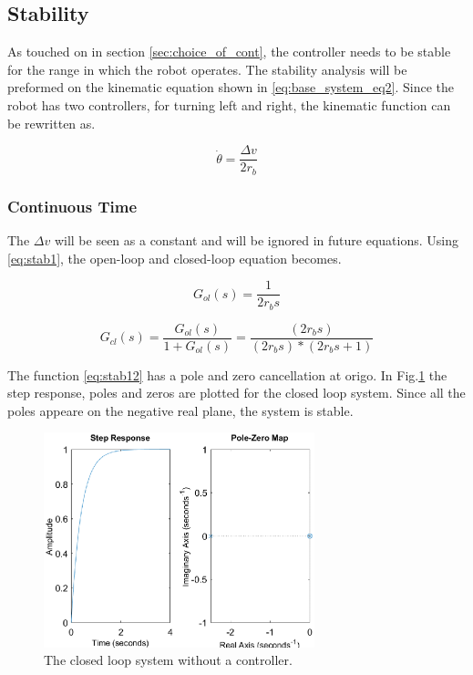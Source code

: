 \subsection{Stability}
As touched on in section \ref{sec:choice_of_cont}, the controller needs to be stable for the range in which the robot operates. The stability analysis will be preformed on the kinematic equation shown in \eqref{eq:base_system_eq2}. Since the robot has two controllers, for turning left and right, the kinematic function can be rewritten as.

\begin{equation}
    \Dot{\theta} = \frac{\Delta v}{2r_b} 
    \label{eq:stab1}
\end{equation}

\subsubsection{Continuous Time}

The $\Delta v$ will be seen as a constant and will be ignored in future equations. Using \eqref{eq:stab1}, the open-loop and closed-loop equation becomes.

\begin{equation}
    G_{ol}(s)=\frac{1}{2 r_b s}
\end{equation}

\begin{equation}
    G_{cl}(s)=\frac{G_{ol}(s)}{1+G_{ol}(s)}=\frac{(2r_b s)}{(2r_b s)*(2r_b s + 1)}
    \label{eq:stab12}
\end{equation}

\noindent The function \eqref{eq:stab12} has a pole and zero cancellation at origo. In Fig.\ref{fig:step1} the step response, poles and zeros are plotted for the closed loop system. Since all the poles appeare on the negative real plane, the system is stable.

\begin{figure}
    \centering
    \includegraphics[width=0.7\textwidth]{img/closed_loop_step.eps}
    \caption{The closed loop system without a controller.}
    \label{fig:step1}
\end{figure}

